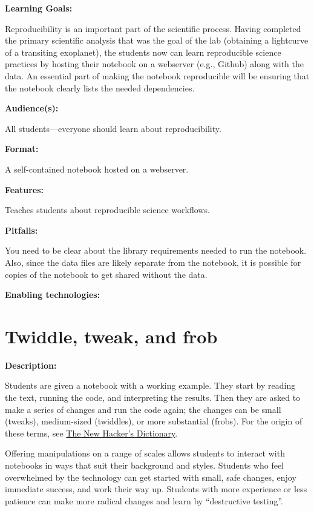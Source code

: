 \documentclass[]{book}
\begin{document}
\textbf{Learning Goals:}

Reproducibility is an important part of the scientific process. Having
completed the primary scientific analysis that was the goal of the lab
(obtaining a lightcurve of a transiting exoplanet), the students now can
learn reproducible science practices by hosting their notebook on a
webserver (e.g., Github) along with the data. An essential part of
making the notebook reproducible will be ensuring that the notebook
clearly lists the needed dependencies.

\textbf{Audience(s):}

All students---everyone should learn about reproducibility.

\textbf{Format:}

A self-contained notebook hosted on a webserver.

\textbf{Features:}

Teaches students about reproducible science workflows.

\textbf{Pitfalls:}

You need to be clear about the library requirements needed to run the
notebook. Also, since the data files are likely separate from the
notebook, it is possible for copies of the notebook to get shared
without the data.

\textbf{Enabling technologies:}

\section{Twiddle, tweak, and frob}\label{twiddle-tweak-and-frob}

\textbf{Description:}

Students are given a notebook with a working example. They start by
reading the text, running the code, and interpreting the results. Then
they are asked to make a series of changes and run the code again; the
changes can be small (tweaks), medium-sized (twiddles), or more
substantial (frobs). For the origin of these terms, see
\href{https://books.google.com/books?id=g80P_4v4QbIC\&pg=PA206\&lpg=PA206\&dq=twiddle+tweak+frob\&source=bl\&ots=6pcpsqgvM5\&sig=FGifP8qpYhhOylnKKLtTuElIjUI\&hl=en\&sa=X\&ved=2ahUKEwjP57yulfreAhXFjVkKHRqNBTsQ6AEwBXoECAoQAQ\#v=onepage\&q=twiddle\%20tweak\%20frob\&f=false}{The
New Hacker's Dictionary}.

Offering manipulations on a range of scales allows students to interact
with notebooks in ways that suit their background and styles. Students
who feel overwhelmed by the technology can get started with small, safe
changes, enjoy immediate success, and work their way up. Students with
more experience or less patience can make more radical changes and learn
by ``destructive testing''.
\end{document}
